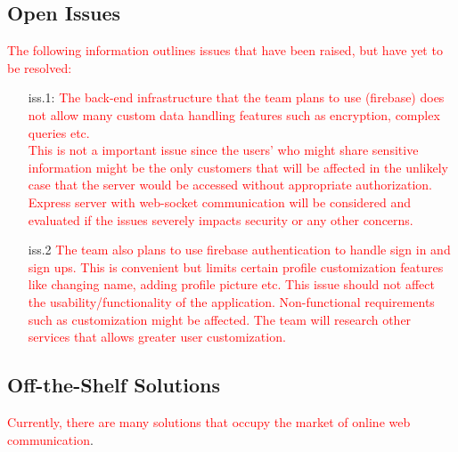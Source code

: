 \documentclass[12pt, titlepage]{article}
\begin{document}
    	\subsection{Open Issues}
        \textcolor{red}{The following information outlines issues that have been raised, but have yet to be resolved:\\}
        \begin{enumerate}
            \item [iss.1:] \textcolor{red}{The back-end infrastructure that the team plans to use (firebase) does not allow many custom data handling features such as encryption, complex queries
                            etc.\\ This is not a important issue since the
                            users' who might share sensitive information might be the only customers that will be affected
                            in the unlikely case that the server would be accessed without appropriate authorization. 
                            Express server with web-socket communication will be considered and evaluated if the issues severely impacts security or any other concerns.}

            \item [iss.2] \textcolor{red}{The team also plans to use firebase authentication to handle sign in and sign ups.
                            This is convenient but limits certain profile customization features
                            like changing name, adding profile picture etc.
                            This issue should not affect the usability/functionality of the application.
                            Non-functional requirements such as customization might be affected.
                            The team will research other services that allows greater user customization.}  
        \end{enumerate}
    	\begin{itemize}
    	\end{itemize}

    	\subsection{Off-the-Shelf Solutions}
		\textcolor{red}{Currently, there are many solutions that occupy the market of online web communication}.	
	    	
\end{document}
